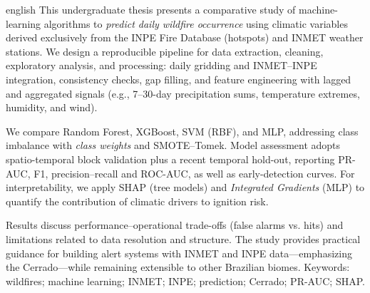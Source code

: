 \begin{resumo}[Abstract]
\begin{otherlanguage*}{english}
This undergraduate thesis presents a comparative study of machine-learning algorithms to \textit{predict daily wildfire occurrence} using climatic variables derived exclusively from the INPE Fire Database (hotspots) and INMET weather stations. We design a reproducible pipeline for data extraction, cleaning, exploratory analysis, and processing: daily gridding and INMET–INPE integration, consistency checks, gap filling, and feature engineering with lagged and aggregated signals (e.g., 7–30-day precipitation sums, temperature extremes, humidity, and wind).

We compare Random Forest, XGBoost, SVM (RBF), and MLP, addressing class imbalance with \textit{class weights} and SMOTE–Tomek. Model assessment adopts spatio-temporal block validation plus a recent temporal hold-out, reporting PR-AUC, F1, precision–recall and ROC-AUC, as well as early-detection curves. For interpretability, we apply SHAP (tree models) and \textit{Integrated Gradients} (MLP) to quantify the contribution of climatic drivers to ignition risk.

Results discuss performance–operational trade-offs (false alarms vs. hits) and limitations related to data resolution and structure. The study provides practical guidance for building alert systems with INMET and INPE data—emphasizing the Cerrado—while remaining extensible to other Brazilian biomes.
Keywords: wildfires; machine learning; INMET; INPE; prediction; Cerrado; PR-AUC; SHAP.
\end{otherlanguage*}
\end{resumo}
